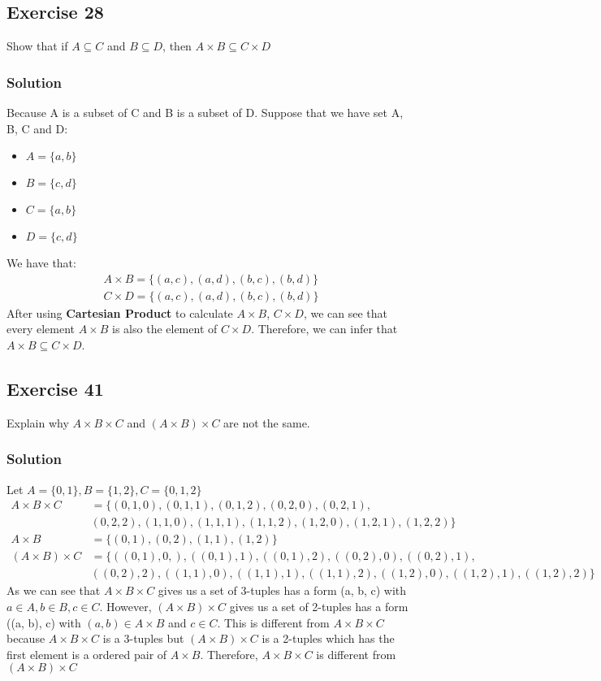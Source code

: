 \documentclass{article}
\theoremstyle{mytheoremstyle}
\theoremstyle{mytheoremstyle}
\theoremstyle{myproblemstyle}
\begin{document}
    \subsection*{Exercise 28} Show that if \(A \subseteq C\) and \(B \subseteq D\), then \(A \times B \subseteq C \times D\)
    \subsubsection*{Solution} Because A is a subset of C and B is a subset of D. Suppose that we have set A, B, C and D:
        \begin{itemize}
            \item \(A = \{a, b\}\)
            \item \(B = \{c, d\}\)
            \item \(C = \{a, b\}\)
            \item \(D = \{c, d\}\)
        \end{itemize}
        We have that: 
        \begin{align*}
            A \times B = \{(a,c),(a,d),(b,c),(b,d)\}\\
            C \times D = \{(a,c),(a,d),(b,c),(b,d)\}
        \end{align*}
        After using \textbf{Cartesian Product} to calculate \(A \times B\), \(C \times D\), we can
        see that every element \(A \times B\) is also the element of \(C \times D\). Therefore,
        we can infer that \(A \times B \subseteq C \times D\).
    \subsection*{Exercise 41}
        Explain why $A \times B \times C$ and $(A \times B) \times C$ are not the same.
    \subsubsection*{Solution}
        Let \(A = \{0, 1\}, B = \{1, 2\}, C = \{0, 1, 2\}\)
        \begin{align*}
            A \times B \times C &= \{(0, 1, 0), (0, 1, 1), (0, 1, 2), (0, 2, 0), (0, 2, 1),\\
            &(0, 2, 2),(1, 1, 0), (1, 1, 1), (1, 1, 2), (1, 2, 0), (1, 2, 1), (1, 2, 2)\}\\
            A \times B &= \{(0,1), (0,2), (1,1), (1,2)\}\\
            (A \times B) \times C &= \{((0,1),0,),((0, 1), 1), ((0, 1), 2), ((0, 2), 0), ((0, 2), 1),\\
            &((0, 2), 2), ((1, 1), 0), ((1, 1), 1), ((1, 1), 2), ((1, 2), 0), ((1, 2), 1), ((1, 2), 2)\}
        \end{align*}
        As we can see that \(A \times B \times C\) gives us  a set of 3-tuples has a form (a, b, c) with 
        \(a \in A, b \in B, c \in C\). However, \((A \times B) \times C\) gives us a set of 2-tuples has
        a form ((a, b), c) with \((a,b) \in A \times B\) and \(c \in C\). This is different from \(A \times B \times C\)
        because \(A \times B \times C\) is a 3-tuples but \((A \times B) \times C\) is a 2-tuples which has the
        first element is a ordered pair of \(A \times B\). Therefore, \(A \times B \times C\) is different from \((A \times B) \times C\)
\end{document}
